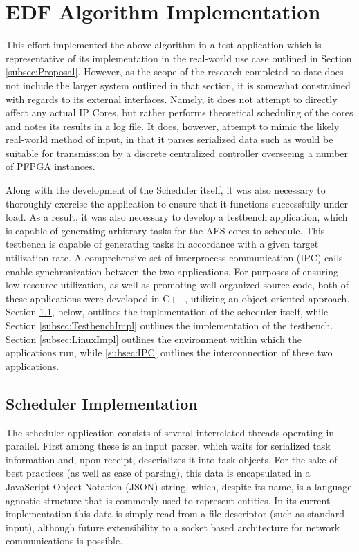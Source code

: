 
\section{EDF Algorithm Implementation}\label{sec:Impl}

This effort implemented the above algorithm in a test application which is representative of its implementation in the real-world use case outlined in Section \ref{subsec:Proposal}. However, as the scope of the research completed to date does not include the larger system outlined in that section, it is somewhat constrained with regards to its external interfaces. Namely, it does not attempt to directly affect any actual IP Cores, but rather performs theoretical scheduling of the cores and notes its results in a log file. It does, however, attempt to mimic the likely real-world method of input, in that it parses serialized data such as would be suitable for transmission by a discrete centralized controller overseeing a number of PFPGA instances.

Along with the development of the Scheduler itself, it was also necessary to thoroughly exercise the application to ensure that it functions successfully under load. As a result, it was also necessary to develop a testbench application, which is capable of generating arbitrary tasks for the AES cores to schedule. This testbench is capable of generating tasks in accordance with a given target utilization rate. A comprehensive set of interprocess communication (IPC) calls enable synchronization between the two applications. For purposes of ensuring low resource utilization, as well as promoting well organized source code, both of these applications were developed in C++, utilizing an object-oriented approach. Section \ref{subsec:SchedulerImpl}, below, outlines the implementation of the scheduler itself, while Section \ref{subsec:TestbenchImpl} outlines the implementation of the testbench. Section \ref{subsec:LinuxImpl} outlines the environment within which the applications run, while \ref{subsec:IPC} outlines the interconnection of these two applications.

\subsection{Scheduler Implementation}\label{subsec:SchedulerImpl}
The scheduler application consists of several interrelated threads operating in parallel. First among these is an input parser, which waits for serialized task information and, upon receipt, deserializes it into task objects. For the sake of best practices (as well as ease of parsing), this data is encapsulated in a JavaScript Object Notation (JSON) string, which, despite its name, is a language agnostic structure that is commonly used to represent entities. In its current implementation this data is simply read from a file descriptor (such as standard input), although future extensibility to a socket based architecture for network communications is possible.


